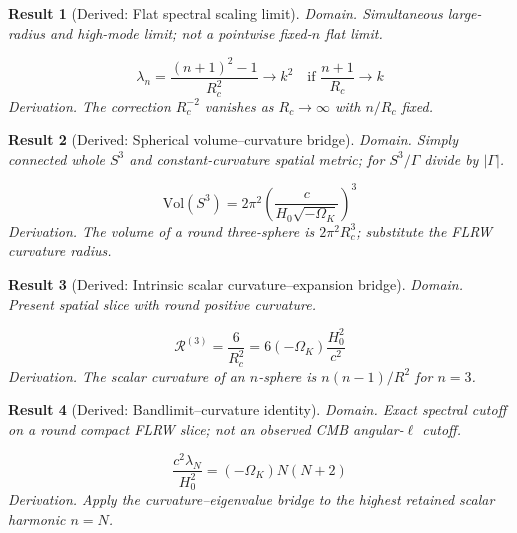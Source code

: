 \documentclass[aps,prd,onecolumn,notitlepage,groupedaddress,11pt]{revtex4-2}
\newtheorem{result}{Result}
\begin{document}
\begin{result}[\textsf{Derived}: Flat spectral scaling limit]\label{res:51}
\textit{Domain.} Simultaneous large-radius and high-mode limit; not a pointwise fixed-$n$ flat limit.\par
\begin{equation}\label{eq:51}
\lambda_n=\frac{(n+1)^2-1}{R_c^2}\longrightarrow k^2\quad\text{if }\frac{n+1}{R_c}\to k
\end{equation}
\textit{Derivation.} The correction $R_c^{-2}$ vanishes as $R_c\to\infty$ with $n/R_c$ fixed.
\end{result}

\begin{result}[\textsf{Derived}: Spherical volume--curvature bridge]\label{res:52}
\textit{Domain.} Simply connected whole $S^3$ and constant-curvature spatial metric; for $S^3/\Gamma$ divide by $|\Gamma|$.\par
\begin{equation}\label{eq:52}
\mathrm{Vol}(S^3)=2\pi^2\left(\frac{c}{H_0\sqrt{-\Omega_K}}\right)^3
\end{equation}
\textit{Derivation.} The volume of a round three-sphere is $2\pi^2R_c^3$; substitute the FLRW curvature radius.
\end{result}

\begin{result}[\textsf{Derived}: Intrinsic scalar curvature--expansion bridge]\label{res:53}
\textit{Domain.} Present spatial slice with round positive curvature.\par
\begin{equation}\label{eq:53}
\mathcal R^{(3)}=\frac6{R_c^2}=6(-\Omega_K)\frac{H_0^2}{c^2}
\end{equation}
\textit{Derivation.} The scalar curvature of an $n$-sphere is $n(n-1)/R^2$ for $n=3$.
\end{result}

\begin{result}[\textsf{Derived}: Bandlimit--curvature identity]\label{res:54}
\textit{Domain.} Exact spectral cutoff on a round compact FLRW slice; not an observed CMB angular-$\ell$ cutoff.\par
\begin{equation}\label{eq:54}
\frac{c^2\lambda_N}{H_0^2}=(-\Omega_K)N(N+2)
\end{equation}
\textit{Derivation.} Apply the curvature--eigenvalue bridge to the highest retained scalar harmonic $n=N$.
\end{result}
\end{document}
